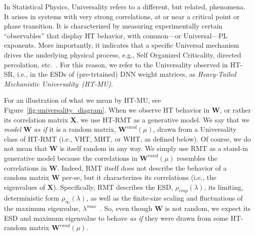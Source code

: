 In Statistical Physics, Universality refers to a different, but related, phenomena.
It arises in systems with very strong correlations, at or near a critical point or phase transition. 
It is characterized by measuring experimentally certain ``observables'' that display HT behavior, with common---or Universal---PL exponents. 
More importantly, it indicates that a specific Universal mechanism drives the underlying physical process, e.g., Self Organized Criticality, directed percolation, etc.~\cite{SornetteBook,BouchaudPotters03}. 
For this reason, we refer to the Universality observed in HT-SR, i.e., in the ESDs of (pre-trtained) DNN weight matrices, as \emph{Heavy-Tailed Mechanistic Universality~(HT-MU)}.

For an illustration of what we mean by HT-MU, see Figure~\ref{fig:universality_diagram}. 
When we observe HT behavior in $\mathbf{W}$, or rather its correlation matrix $\mathbf{X}$, we use HT-RMT as a generative model. 
We say that we \emph{model} $\mathbf{W}$ \emph{as if} it is a random matrix, $\mathbf{W}^{rand}(\mu)$, drawn from a Universality class of HT-RMT (i.e., VHT, MHT, or WHT, as defined below). 
Of course, we do not mean that $\mathbf{W}$ is itself random in any way.
We simply use RMT as a stand-in generative model because the correlations in $\mathbf{W}^{rand}(\mu)$ resembles the correlations in  $\mathbf{W}$. 
Indeed, RMT itself does not describe the behavior of a random matrix $\mathbf{W}$ per-se, but it characterizes its correlations (i.e., the eigenvalues of $\mathbf{X}$). 
Specifically, RMT describes the ESD, $\rho_{emp}(\lambda)$, its limiting, deterministic form $\rho_{\infty}(\lambda)$, as well as the finite-size scaling and fluctuations of the maximum eigenvalue, $\lambda^{max}$~\cite{MM18_TR,MM19_HTSR_ICML}. 
So, even though $\mathbf{W}$ is not random, we expect its ESD and maximum eigenvalue to behave \emph{as if} they were drawn from some HT-random matrix $\mathbf{W}^{rand}(\mu)$.
   
 


